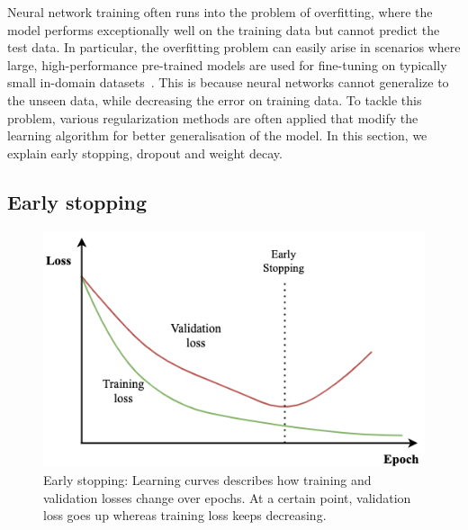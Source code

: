 Neural network training often runs into the problem of overfitting, where the model performs exceptionally well on the training data but cannot predict the test data. In particular, the overfitting problem can easily arise in scenarios where large, high-performance pre-trained models are used for fine-tuning on typically small in-domain datasets~\parencite{geman1992neural}. This is because neural networks cannot generalize to the unseen data, while decreasing the error on training data. To tackle this problem, various regularization methods are often applied that modify the learning algorithm for better generalisation of the model. In this section, we explain early stopping, dropout and weight decay.

\subsection{Early stopping}\label{chapter:early_stopping}

\begin{figure}[ht]
    \centering
    \includegraphics[scale=0.53]{images/early_stopping.png}
    \caption{Early stopping: Learning curves describes how training and validation losses change over epochs. At a certain point, validation loss goes up whereas training loss keeps decreasing.}
    \label{fig:Early stopping}
\end{figure}

